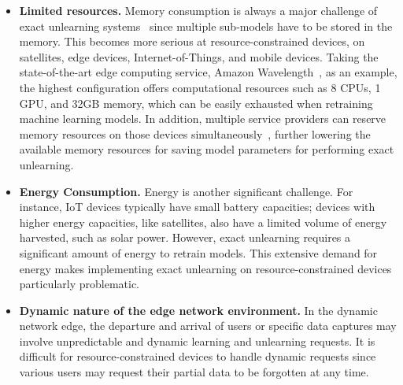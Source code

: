 \documentclass[conference,compsoc]{IEEEtran}
\begin{document}
\begin{itemize}[leftmargin=*, noitemsep]
    \item \textbf{Limited resources.} Memory consumption is always a major challenge of exact unlearning systems~\cite{bourtoule2021machine, chen2022recommendation, yan2022arcane} since multiple sub-models have to be stored in the memory. This becomes more serious at resource-constrained devices, \eg on satellites, edge devices, Internet-of-Things, and mobile devices. 
    Taking the state-of-the-art edge computing service, Amazon Wavelength~\cite{amazon_wavelength}, as an example, the highest configuration offers computational resources such as 8 CPUs, 1 GPU, and 32GB memory, which can be easily exhausted when retraining machine learning models.
    In addition, multiple service providers can reserve memory resources on those devices simultaneously~\cite{xia2022formulating, xia2021constrained}, further lowering the available memory resources for saving model parameters for performing exact unlearning.
    \item \textbf{Energy Consumption.} Energy is another significant challenge. For instance, IoT devices typically have small battery capacities; devices with higher energy capacities, like satellites, also have a limited volume of energy harvested, such as solar power. However, exact unlearning requires a significant amount of energy to retrain models. This extensive demand for energy makes implementing exact unlearning on resource-constrained devices particularly problematic.    \item \textbf{Dynamic nature of the edge network environment.} In the dynamic network edge, the departure and arrival of users or specific data captures may involve unpredictable and dynamic learning and unlearning requests. It is difficult for resource-constrained devices to handle dynamic requests since various users may request their partial data to be forgotten at any time. 
\end{itemize}
\end{document}
